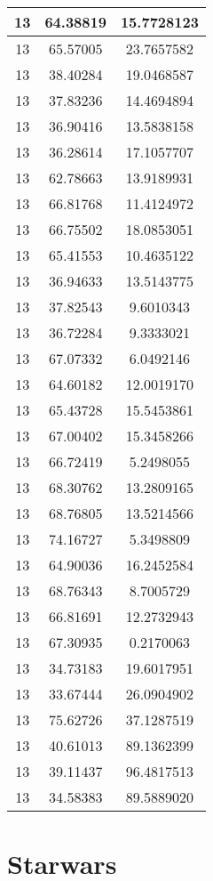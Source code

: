 \documentclass[
]{book}
\begin{document}
\begin{tabular}{c|c|c}
\hline
13 & 64.38819 & 15.7728123\\
\hline
13 & 65.57005 & 23.7657582\\
\hline
13 & 38.40284 & 19.0468587\\
\hline
13 & 37.83236 & 14.4694894\\
\hline
13 & 36.90416 & 13.5838158\\
\hline
13 & 36.28614 & 17.1057707\\
\hline
13 & 62.78663 & 13.9189931\\
\hline
13 & 66.81768 & 11.4124972\\
\hline
13 & 66.75502 & 18.0853051\\
\hline
13 & 65.41553 & 10.4635122\\
\hline
13 & 36.94633 & 13.5143775\\
\hline
13 & 37.82543 & 9.6010343\\
\hline
13 & 36.72284 & 9.3333021\\
\hline
13 & 67.07332 & 6.0492146\\
\hline
13 & 64.60182 & 12.0019170\\
\hline
13 & 65.43728 & 15.5453861\\
\hline
13 & 67.00402 & 15.3458266\\
\hline
13 & 66.72419 & 5.2498055\\
\hline
13 & 68.30762 & 13.2809165\\
\hline
13 & 68.76805 & 13.5214566\\
\hline
13 & 74.16727 & 5.3498809\\
\hline
13 & 64.90036 & 16.2452584\\
\hline
13 & 68.76343 & 8.7005729\\
\hline
13 & 66.81691 & 12.2732943\\
\hline
13 & 67.30935 & 0.2170063\\
\hline
13 & 34.73183 & 19.6017951\\
\hline
13 & 33.67444 & 26.0904902\\
\hline
13 & 75.62726 & 37.1287519\\
\hline
13 & 40.61013 & 89.1362399\\
\hline
13 & 39.11437 & 96.4817513\\
\hline
13 & 34.58383 & 89.5889020\\
\hline
\end{tabular}

\hypertarget{starwars}{%
\chapter{Starwars}\label{starwars}}
\end{document}
